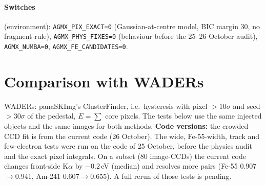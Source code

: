 \documentclass[10pt,a4paper]{article}
\newcommand{\code}[1]{\texttt{#1}}
\begin{document}
\paragraph{Switches} (environment): \code{AGMX\_PIX\_EXACT=0} (Gaussian-at-centre model, BIC margin 30, no fragment
rule), \code{AGMX\_PHYS\_FIXES=0} (behaviour before the 25--26 October audit), \code{AGMX\_NUMBA=0},
\code{AGMX\_FE\_CANDIDATES=0}.

\section{Comparison with WADERs}

WADERs: panaSKImg's ClusterFinder, i.e.\ hysteresis with pixel $>10\sigma$ and seed $>30\sigma$ of the pedestal,
$E=\sum$ core pixels. The tests below use the same injected objects and the same images for both methods.
\textbf{Code versions:} the crowded-CCD fit is from the current code (26 October). The wide, Fe-55-width, track and
few-electron tests were run on the code of 25 October, before the physics audit and the exact pixel integrals. On a
subset (80 image-CCDs) the current code changes front-side K$\alpha$ by $-0.2$\,eV (median) and resolves more pairs
(Fe-55 0.907$\to$0.941, Am-241 0.607$\to$0.655). A full rerun of those tests is pending.
\end{document}
